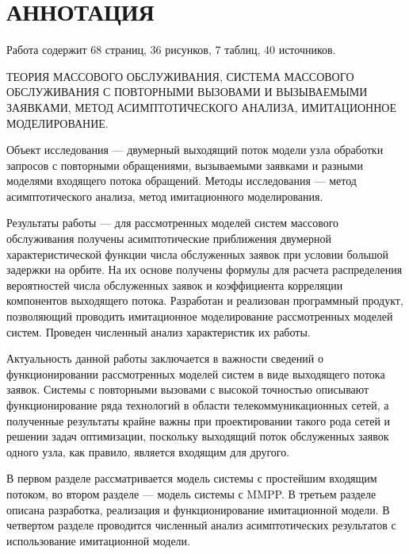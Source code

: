 \section*{\normalsize\centering АННОТАЦИЯ}
Работа содержит 68 страниц, 36 рисунков, 7 таблиц, 40 источников.
 
ТЕОРИЯ МАССОВОГО ОБСЛУЖИВАНИЯ, СИСТЕМА МАССОВОГО ОБСЛУЖИВАНИЯ С ПОВТОРНЫМИ ВЫЗОВАМИ И ВЫЗЫВАЕМЫМИ ЗАЯВКАМИ, МЕТОД АСИМПТОТИЧЕСКОГО АНАЛИЗА, ИМИТАЦИОННОЕ МОДЕЛИРОВАНИЕ.

Объект исследования --- двумерный выходящий поток модели узла обработки запросов с повторными обращениями, вызываемыми заявками и разными моделями входящего потока обращений.
Методы исследования --- метод асимптотического анализа, метод имитационного моделирования. 

Результаты работы --- для рассмотренных моделей систем массового обслуживания получены асимптотические приближения двумерной характеристической функции числа обслуженных заявок при условии большой задержки на орбите. На их основе получены формулы для расчета распределения вероятностей числа обслуженных заявок и коэффициента корреляции компонентов выходящего потока. Разработан и реализован программный продукт, позволяющий проводить имитационное моделирование рассмотренных моделей систем. Проведен численный анализ характеристик их работы.

Актуальность данной работы заключается в важности сведений о функционировании рассмотренных моделей систем в виде выходящего потока заявок. Системы с повторными вызовами с высокой точностью описывают функционирование ряда технологий в области телекоммуникационных сетей, а полученные результаты крайне важны при проектировании такого рода сетей и решении задач оптимизации, поскольку выходящий поток обслуженных заявок одного узла, как правило, является входящим для другого.

В первом разделе рассматривается модель системы с простейшим входящим потоком, во втором разделе --- модель системы с MMPP. В третьем разделе описана разработка, реализация и функционирование имитационной модели. В четвертом разделе проводится численный анализ асимптотических результатов с использование имитационной модели.

\thispagestyle{empty} %
\clearpage